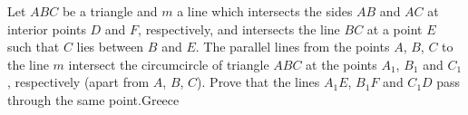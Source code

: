 Let $ABC$ be a triangle and $m$ a line which intersects the sides $AB$ and $AC$ at interior points $D$ and $F$,  respectively, and intersects the line $BC$ at a point $E$ such that $C$ lies between $B$ and $E$. The parallel lines from the points $A$,  $B$,  $C$ to the line $m$ intersect the circumcircle of triangle $ABC$ at the points $A_1$,  $B_1$  and $C_1$,  respectively (apart from $A$,  $B$,  $C$). Prove that the lines $A_1E$, $B_1F$  and  $C_1D$  pass through the same point.Greece